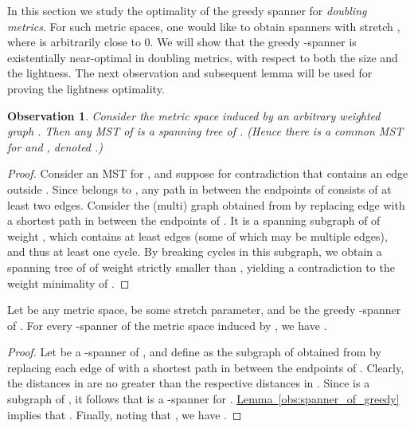 \documentclass[11pt,letterpaper]{article}
\newtheorem{observation}[lemma]{Observation}
\newcommand{\namedref}[2]{\hyperref[#2]{#1~\ref*{#2}}}
\newcommand{\lemmaref}[1]{\namedref{Lemma}{#1}}
\begin{document}
In this section we study the optimality of the greedy spanner for \emph{doubling metrics}.
For such metric spaces, one would like to obtain spanners with stretch , where  is arbitrarily close to 0.
We will show that the greedy -spanner is existentially near-optimal in doubling metrics, with respect to both the size and the lightness.
The next observation and subsequent lemma will be used for proving the lightness optimality.
\begin{observation} \label{mst-metric}
	Consider the metric space  induced by an arbitrary weighted graph .
	Then any MST of  is a spanning tree of . (Hence there is a common MST for  and , denoted .)
\end{observation}
\begin{proof}
	Consider an MST  for , and suppose for contradiction that  contains an edge  outside .
	Since  belongs to , any path in  between the endpoints of  consists of at least two edges.
	Consider the (multi) graph obtained from  by replacing edge  with a shortest path in  between the endpoints of .
	It is a spanning subgraph of  of weight , which contains at least  edges (some of which may be multiple edges), and thus at least one cycle. By breaking cycles in this subgraph,
	we obtain a spanning tree of  of weight strictly smaller than , yielding a contradiction to the weight minimality of .
\end{proof}


\begin{lemma} \label{lightopt}
	Let  be any metric space,  be some stretch parameter, and  be the greedy -spanner of .
	For every -spanner  of the metric space  induced by , we have .
\end{lemma}
\begin{proof}
	Let  be a -spanner of , and define  as the subgraph of  obtained from  by replacing each edge  of  with a shortest path in  between
	the endpoints of .
	Clearly, the distances in  are no greater than the respective distances in .
	Since  is a subgraph of , it follows that  is a -spanner for .
	\lemmaref{obs:spanner_of_greedy} implies that .
	Finally, noting that , we have .
\end{proof}
\end{document}
